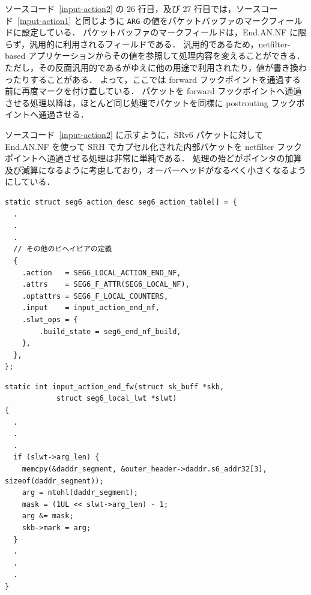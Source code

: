 ソースコード~\ref*{input-action2} の 26 行目，及び 27 行目では，ソースコード~\ref*{input-action1} と同じように \texttt{ARG} の値をパケットバッファのマークフィールドに設定している．
パケットバッファのマークフィールドは，End.AN.NF に限らず，汎用的に利用されるフィールドである．
汎用的であるため，netfilter-based アプリケーションからその値を参照して処理内容を変えることができる．
ただし，その反面汎用的であるがゆえに他の用途で利用されたり，値が書き換わったりすることがある．
よって，ここでは forward フックポイントを通過する前に再度マークを付け直している．
パケットを forward フックポイントへ通過させる処理以降は，ほとんど同じ処理でパケットを同様に postrouting フックポイントへ通過させる．

ソースコード~\ref*{input-action2} に示すように，SRv6 パケットに対して End.AN.NF を使って SRH でカプセル化された内部パケットを netfilter フックポイントへ通過させる処理は非常に単純である．
処理の殆どがポインタの加算及び減算になるように考慮しており，オーバーヘッドがなるべく小さくなるようにしている．


\begin{lstlisting}[caption=\texttt{seg6\_action\_table} へ End.AN.NF の定義を追加する実装,label=seg6-action-desc]
static struct seg6_action_desc seg6_action_table[] = {
  .
  .
  .
  // その他のビヘイビアの定義
  {
    .action   = SEG6_LOCAL_ACTION_END_NF,
    .attrs    = SEG6_F_ATTR(SEG6_LOCAL_NF),
    .optattrs = SEG6_F_LOCAL_COUNTERS,
    .input    = input_action_end_nf,
    .slwt_ops = {
        .build_state = seg6_end_nf_build,
    },
  },
};
\end{lstlisting}

\begin{lstlisting}[caption=\texttt{ARG} の値をパケットバッファに付加する処理の実装,label=input-action1]
static int input_action_end_fw(struct sk_buff *skb,
  			struct seg6_local_lwt *slwt)
{
  .
  .
  .
  if (slwt->arg_len) {
    memcpy(&daddr_segment, &outer_header->daddr.s6_addr32[3], sizeof(daddr_segment));
    arg = ntohl(daddr_segment);
    mask = (1UL << slwt->arg_len) - 1;
    arg &= mask;
    skb->mark = arg;
  }
  .
  .
  .
}
\end{lstlisting}

